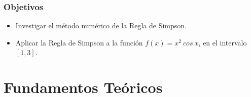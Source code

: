 \documentclass{beamer}
\begin{document}
\begin{frame}

  \frametitle{Objetivos}

  \begin{block}{}
    \begin{itemize}
      \item Investigar el método numérico de la Regla de Simpson. 
      \item Aplicar la Regla de Simpson a la función $f(x)=x^{2}\ cos\ x$, en el intervalo $[1,3]$.
    \end{itemize}
  \end{block}

\end{frame}

\section{Fundamentos Teóricos}
\end{document}
